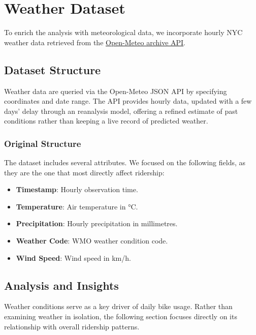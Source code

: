 \section{Weather Dataset}
To enrich the analysis with meteorological data, we incorporate hourly NYC weather data retrieved from the \href{https://open-meteo.com/}{\underline{Open-Meteo archive API}}.

\subsection{Dataset Structure}
Weather data are queried via the Open-Meteo JSON API by specifying coordinates and date range.
The API provides hourly data, updated with a few days' delay through an reanalysis model, offering a refined estimate of past conditions rather than keeping a live record of predicted weather.

\subsubsection{Original Structure}
The dataset includes several attributes. We focused on the following fields, as they are the one that most directly affect ridership:
\begin{itemize}
    \item \textbf{Timestamp}: Hourly observation time.
    \item \textbf{Temperature}: Air temperature in \si{\degreeCelsius}.
    \item \textbf{Precipitation}: Hourly precipitation in millimetres.
    \item \textbf{Weather Code}: WMO weather condition code.
    \item \textbf{Wind Speed}: Wind speed in km/h.
\end{itemize}

\subsection{Analysis and Insights}
Weather conditions serve as a key driver of daily bike usage.
Rather than examining weather in isolation, the following section focuses directly on its relationship with overall ridership patterns.

